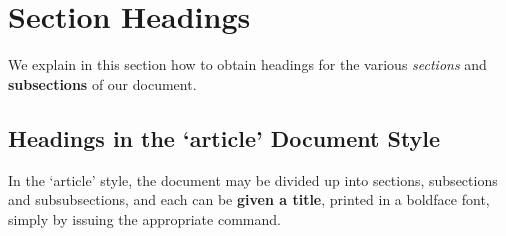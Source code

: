 \documentclass{article}
\begin{document}
\section*{Section Headings}

We explain in this section how to obtain headings
for the various \textit{sections} and \textbf{subsections} of our
document.

\subsection*{Headings in the ‘article’ Document Style}
In the ‘article’ style, the document may be divided up
into sections, subsections and subsubsections, and each
can be \textbf{given a title}, printed in a boldface font,
simply by issuing the appropriate command.
\end{document}

